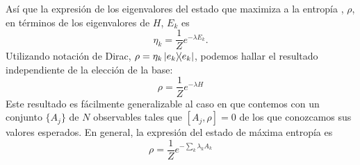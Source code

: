 Así que la expresión de los eigenvalores del estado que maximiza a la entropía , $\rho$, en términos de los eigenvalores de $H$, $E_{k}$ es
\begin{equation*}
    \eta_{k}=\frac{1}{Z}e^{-\lambda E_{k}}.
\end{equation*}
Utilizando notación de Dirac, $\rho=\eta_{k}\dyad{e_{k}}$, podemos hallar el resultado independiente de la elección de la base:
\begin{equation}
    \rho=\frac{1}{Z}e^{-\lambda H}
\end{equation}
Este resultado es fácilmente generalizable al caso en que contemos con un  conjunto $\{A_{j}\}$ de $N$ observables tales que $[A_{j},\rho]=0$\ddnote{,} de los que conozcamos sus valores esperados. En general, la expresión del estado de máxima entropía es
\begin{equation}
    \rho=\frac{1}{Z}e^{-\sum_{k}\lambda_{k} A_{k}}
\end{equation}

